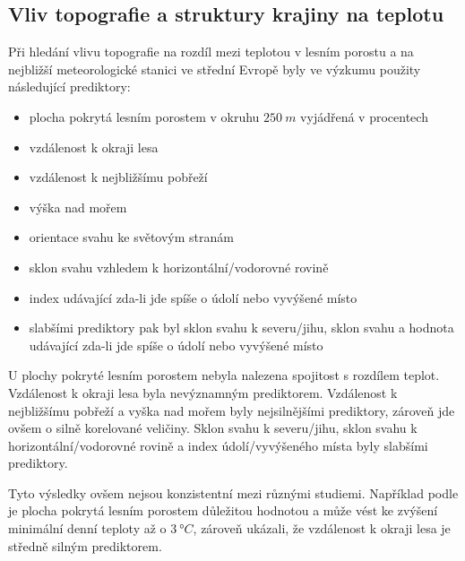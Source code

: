 \subsection{Vliv topografie a struktury krajiny na teplotu}
Při hledání vlivu topografie na rozdíl mezi teplotou v lesním porostu a na nejbližší meteorologické stanici ve střední Evropě byly ve výzkumu \parencite{ZellwegerFlorian2019Sdou} použity následující prediktory:
\begin{itemize}
	\item plocha pokrytá lesním porostem v okruhu $\SI{250}{m}$ vyjádřená v procentech
	\item vzdálenost k okraji lesa
	\item vzdálenost k nejbližšímu pobřeží
	\item výška nad mořem
	\item orientace svahu ke světovým stranám
	\item sklon svahu vzhledem k horizontální/vodorovné rovině
	\item index udávající zda-li jde spíše o údolí nebo vyvýšené místo
	\item slabšími prediktory pak byl sklon svahu k severu/jihu, sklon svahu a hodnota udávající zda-li jde spíše o údolí nebo vyvýšené místo
\end{itemize}
U plochy pokryté lesním porostem nebyla nalezena spojitost s rozdílem teplot. Vzdálenost k okraji lesa byla nevýznamným prediktorem. Vzdálenost k nejbližšímu pobřeží a vyška nad mořem byly nejsilnějšími prediktory, zároveň jde ovšem o silně korelované veličiny. Sklon svahu k severu/jihu, sklon svahu k horizontální/vodorovné rovině a index údolí/vyvýšeného místa byly slabšími prediktory.

Tyto výsledky ovšem nejsou konzistentní mezi různými studiemi. Například podle \parencite{GreiserCaroline2018Mmmi} je plocha pokrytá lesním porostem důležitou hodnotou a může vést ke zvýšení minimální denní teploty až o $\SI{3}{\degree C}$, zároveň \parencite{GreiserCaroline2018Mmmi} ukázali, že vzdálenost k okraji lesa je středně silným prediktorem.

